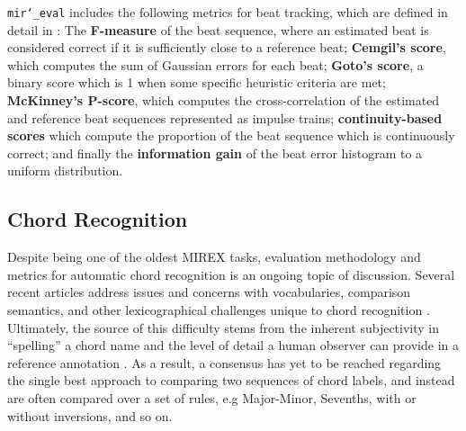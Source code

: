 \documentclass{article}
\def\mireval{\texttt{mir\char`_eval}}
\begin{document}
\mireval{} includes the following metrics for beat tracking, which are defined in detail in \cite{davies2009evaluation}:
The \textbf{F-measure} of the beat sequence, where an estimated beat is considered correct if it is sufficiently close to a reference beat;
\textbf{Cemgil's score}, which computes the sum of Gaussian errors for each beat;
\textbf{Goto's score}, a binary score which is 1 when some specific heuristic criteria are met;
\textbf{McKinney's P-score}, which computes the cross-correlation of the estimated and reference beat sequences represented as impulse trains;
\textbf{continuity-based scores} which compute the proportion of the beat sequence which is continuously correct;
and finally the \textbf{information gain} of the beat error histogram to a uniform distribution.

\subsection{Chord Recognition}


Despite being one of the oldest MIREX tasks, evaluation methodology and metrics for automatic chord recognition is an ongoing topic of discussion.
Several recent articles address issues and concerns with vocabularies, comparison semantics, and other lexicographical challenges unique to chord recognition \cite{}.
Ultimately, the source of this difficulty stems from the inherent subjectivity in ``spelling'' a chord name and the level of detail a human observer can provide in a reference annotation \cite{McVicar}.
As a result, a consensus has yet to be reached regarding the single best approach to comparing two sequences of chord labels, and instead are often compared over a set of rules, e.g Major-Minor, Sevenths, with or without inversions, and so on.
\end{document}
